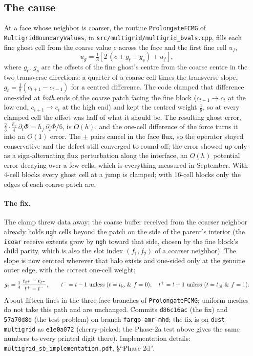 \documentclass[11pt]{article}
\newcommand{\code}[1]{\texttt{#1}}
\newcommand{\file}[1]{\texttt{#1}}
\newcommand{\fn}[1]{\texttt{#1}}
\begin{document}
\subsection{The cause}
At a face whose neighbor is coarser, the routine \fn{ProlongateFCMG} of
\fn{MultigridBoundaryValues}, in \file{src/multigrid/multigrid\_bvals.cpp}, fills each fine ghost cell from the coarse value
$c$ across the face and the first fine cell $u_f$,
\begin{equation}
u_g = \tfrac13\left[2\,(c \pm g_t \pm g_s) + u_f\right],
\end{equation}
where $g_t$, $g_s$ are the offsets of the fine ghost's centre from the coarse centre in the
two transverse directions: a quarter of a coarse cell times the transverse slope,
$g_t = \tfrac18(c_{t+1} - c_{t-1})$ for a centred difference. The code clamped that difference
one-sided at \emph{both} ends of the coarse patch facing the fine block
($c_{t-1} \to c_t$ at the low end, $c_{t+1} \to c_t$ at the high end) and kept the centred
weight $\tfrac18$, so at every clamped cell the offset was half of what it should be. The
resulting ghost error, $\tfrac23\cdot\tfrac{h_f}{4}\,\partial_t\Phi = h_f\,\partial_t\Phi/6$, is $O(h)$, and the one-cell difference of
the force turns it into an $O(1)$ error. The $\pm$ pairs cancel in the face flux, so the
operator stayed conservative and the defect still converged to round-off; the error showed up
only as a sign-alternating flux perturbation along the interface, an $O(h)$ potential error
decaying over a few cells, which is everything measured in September. With 4-cell blocks every
ghost cell at a jump is clamped; with 16-cell blocks only the edges of each coarse patch are.

\paragraph{The fix.} The clamp threw data away: the coarse buffer received from the coarser
neighbor already holds \code{ngh} cells beyond the patch on the side of the parent's interior
(the \code{icoar} receive extents grow by \code{ngh} toward that side, chosen by the fine
block's child parity, which is also the slot index $(f_1, f_2)$ of a coarser neighbor). The
slope is now centred wherever that halo exists and one-sided only at the genuine outer edge,
with the correct one-cell weight:
\begin{equation}
g_t = \tfrac14\,\frac{c_{t^+} - c_{t^-}}{t^+ - t^-},
\qquad t^- = t-1 \text{ unless } (t = t_{\rm lo}\ \&\ f = 0),\quad
t^+ = t+1 \text{ unless } (t = t_{\rm hi}\ \&\ f = 1).
\end{equation}
About fifteen lines in the three face branches of \fn{ProlongateFCMG}; uniform meshes do not
take this path and are unchanged. Commits \code{d86c16ac} (the fix) and \code{57a70d8d} (the
test problem) on branch \code{fargo-amr-mhd}; the fix is on \code{dust-multigrid} as \code{e1e0a072}
(cherry-picked; the Phase-2a test above gives the same numbers to every printed digit there). Implementation details: \file{multigrid\_sb\_implementation.pdf},
\S``Phase 2d''.
\end{document}
